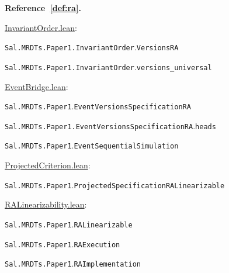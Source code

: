 \medskip\noindent\textbf{Reference~\ref{def:ra}.}\par\nobreak
\noindent\href{https://github.com/fplaunchpad/sal/blob/07fe525/Sal/MRDTs/Paper1/InvariantOrder.lean}{InvariantOrder.lean}:\par
{\small\nolinkurl{Sal.MRDTs.Paper1.InvariantOrder}.\allowbreak\nolinkurl{VersionsRA}}\par
{\small\nolinkurl{Sal.MRDTs.Paper1.InvariantOrder}.\allowbreak\nolinkurl{versions_universal}}\par
\noindent\href{https://github.com/fplaunchpad/sal/blob/paper1/Sal/MRDTs/Paper1/EventBridge.lean}{EventBridge.lean}:\par
{\small\nolinkurl{Sal.MRDTs.Paper1}.\allowbreak\nolinkurl{EventVersionsSpecificationRA}}\par
{\small\nolinkurl{Sal.MRDTs.Paper1.EventVersionsSpecificationRA}.\allowbreak\nolinkurl{heads}}\par
{\small\nolinkurl{Sal.MRDTs.Paper1}.\allowbreak\nolinkurl{EventSequentialSimulation}}\par
\noindent\href{https://github.com/fplaunchpad/sal/blob/07fe525/Sal/MRDTs/Paper1/ProjectedCriterion.lean}{ProjectedCriterion.lean}:\par
{\small\nolinkurl{Sal.MRDTs.Paper1}.\allowbreak\nolinkurl{ProjectedSpecificationRALinearizable}}\par
\noindent\href{https://github.com/fplaunchpad/sal/blob/paper1/Sal/MRDTs/Paper1/RALinearizability.lean}{RALinearizability.lean}:\par
{\small\nolinkurl{Sal.MRDTs.Paper1}.\allowbreak\nolinkurl{RALinearizable}}\par
{\small\nolinkurl{Sal.MRDTs.Paper1}.\allowbreak\nolinkurl{RAExecution}}\par
{\small\nolinkurl{Sal.MRDTs.Paper1}.\allowbreak\nolinkurl{RAImplementation}}\par

